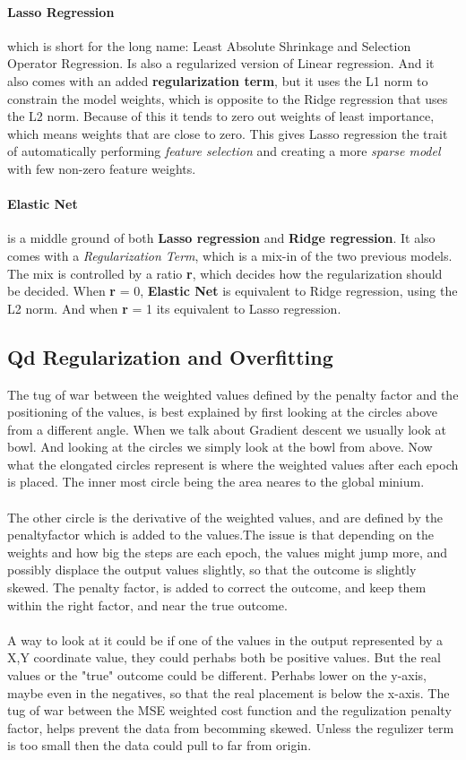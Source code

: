 \documentclass{article}
\begin{document}
\paragraph{Lasso Regression} which is short for the long name: Least Absolute Shrinkage and Selection Operator Regression. Is also a regularized version of Linear regression. And it also comes with an added \textbf{regularization term}, but it uses the L1 norm to constrain the model weights, which is opposite to the Ridge regression that uses the L2 norm. Because of this it tends to zero out weights of least importance, which means weights that are close to zero. This gives Lasso regression the trait of automatically performing \textit{feature selection} and creating a more \textit{sparse model} with few non-zero feature weights.

\paragraph{Elastic Net} is a middle ground of both \textbf{Lasso regression} and \textbf{Ridge regression}. It also comes with a \textit{Regularization Term}, which is a mix-in of the two previous models. The mix is controlled by a ratio \textbf{r}, which decides how the regularization should be decided. When \textbf{r} = 0, \textbf{Elastic Net} is equivalent to Ridge regression, using the L2 norm. And when \textbf{r} = 1 its equivalent to Lasso regression.
 
\subsection{Qd Regularization and Overfitting}
The tug of war between the weighted values defined by the penalty factor and the positioning of the values,
is best explained by first looking at the circles above from a different angle. When we talk about Gradient descent we usually look at bowl. And looking at the circles we simply look at the bowl from above.
Now what the elongated circles represent is where the weighted values after each epoch is placed. 
The inner most circle being the area neares to the global minium.
\\\\
The other circle is the derivative of the weighted values, and are defined by the penaltyfactor which is added to the values.The issue is that depending on the weights and how big the steps are each epoch, the values might jump more, and possibly displace the output values slightly, so that the outcome is slightly skewed. The penalty factor, is added to correct the outcome, and keep them within the right factor, and near the true outcome.
\\ \\
A way to look at it could be if one of the values in the output represented by a X,Y coordinate value,
they could perhabs both be positive values. But the real values or the "true" outcome could be different.
Perhabs lower on the y-axis, maybe even in the negatives, so that the real placement is below the x-axis.
The tug of war between the MSE weighted cost function and the regulization penalty factor,
helps prevent the data from becomming skewed. Unless the regulizer term is too small then the data could pull to far from origin.
\end{document}
